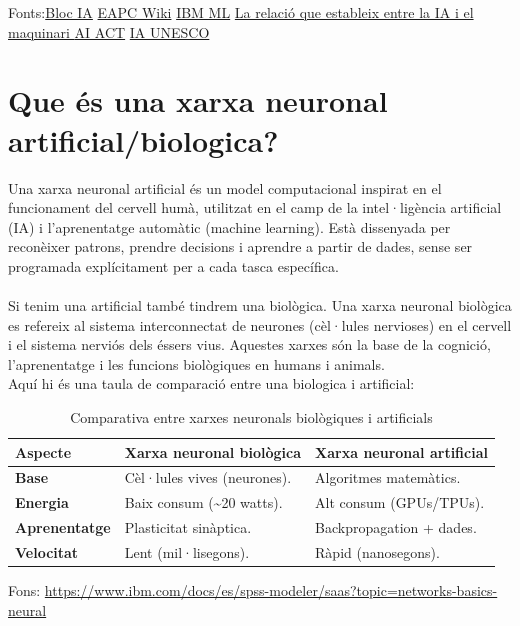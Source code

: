 Fonts:\href{https://blogs.uoc.edu/digitapia/the-european-unions-artificial-intelligence-act-explained/}{Bloc IA} \href{https://formaciooberta.eapc.gencat.cat/contingutsdelscursos/tdp/080_int_artificial/inici.html}{EAPC Wiki}
\href{https://www.ibm.com/think/topics/machine-learning}{IBM ML} \href{https://www.ultralytics.com/es/blog/understanding-the-impact-of-compute-power-on-ai-innovations}{La relació que estableix entre la IA i el maquinari }\cite{bengio2012} \href{https://digital-strategy.ec.europa.eu/en/policies/regulatory-framework-ai?utm_source=chatgpt.com}{AI ACT} \href{https://www.unesco.org/en/legal-affairs/recommendation-ethics-artificial-intelligence?utm_source=chatgpt.com}{IA UNESCO}

\section{Que és una xarxa neuronal artificial/biologica?}\label{sec:xarxa neuronal}
Una xarxa neuronal artificial és un model computacional inspirat en el funcionament del cervell humà, utilitzat en el camp de la intel·ligència artificial (IA) i l'aprenentatge automàtic (machine learning). Està dissenyada per reconèixer patrons, prendre decisions i aprendre a partir de dades, sense ser programada explícitament per a cada tasca específica.\\ \\
Si tenim una artificial també tindrem una biològica. Una xarxa neuronal biològica es refereix al sistema interconnectat de neurones (cèl·lules nervioses) en el cervell i el sistema nerviós dels éssers vius. Aquestes xarxes són la base de la cognició, l'aprenentatge i les funcions biològiques en humans i animals.\\
Aquí hi és una taula de comparació entre una biologica i artificial:

\begin{table}[h!]
\begin{tabular}{|l|l|l|}
\hline
\textbf{Aspecte} & \textbf{Xarxa neuronal biològica} & \textbf{Xarxa neuronal artificial} \\ \hline
\textbf{Base} & Cèl·lules vives (neurones). & Algoritmes matemàtics. \\ \hline
\textbf{Energia} & Baix consum (\textasciitilde20 watts). & Alt consum (GPUs/TPUs). \\ \hline
\textbf{Aprenentatge} & Plasticitat sinàptica. & Backpropagation + dades. \\ \hline
\textbf{Velocitat} & Lent (mil·lisegons). & Ràpid (nanosegons). \\ \hline
\end{tabular}
\caption{Comparativa entre xarxes neuronals biològiques i artificials}
\end{table}
Fons: \href{https://www.ibm.com/docs/es/spss-modeler/saas?topic=networks-basics-neural}{https://www.ibm.com/docs/es/spss-modeler/saas?topic=networks-basics-neural}

